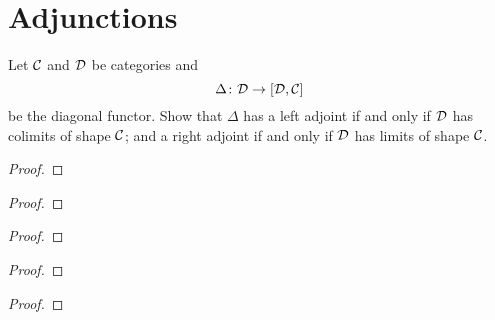 \section{Adjunctions}
\begin{exercise}{64}
    Let $\mathcal{C}$ and $\mathcal{D}$ be categories and 
    \[\Delta\colon\mathcal{D}\to[\mathcal{D},\mathcal{C}]\]
    be the diagonal functor. Show that $\Delta$ has a left adjoint if and only if $\mathcal{D}$ has colimits of shape $\mathcal{C}$; and a right adjoint if and only if $\mathcal{D}$ has limits of shape $\mathcal{C}$.
\end{exercise}
\begin{solution}
    \begin{proof}
        
    \end{proof}
\end{solution}
\begin{exercise}{65}
    
\end{exercise}
\begin{solution}
    \begin{proof}
        
    \end{proof}
\end{solution}
\begin{exercise}{66}
    
\end{exercise}
\begin{solution}
    \begin{proof}
        
    \end{proof}
\end{solution}
\begin{exercise}{67}
    
\end{exercise}
\begin{solution}
    \begin{proof}
        
    \end{proof}
\end{solution}
\begin{exercise}{68}
    
\end{exercise}
\begin{solution}
    \begin{proof}
        
    \end{proof}
\end{solution}
\begin{exercise}{69}
    
\end{exercise}
